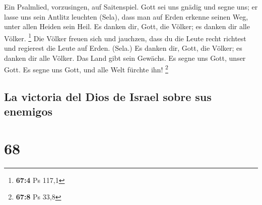  Ein Psalmlied, vorzusingen, auf Saitenspiel.
 Gott sei uns gnädig und segne uns; er lasse uns sein
Antlitz leuchten (Sela),  dass man auf Erden erkenne
seinen Weg, unter allen Heiden sein Heil.  Es danken dir,
Gott, die Völker; es danken dir alle Völker. \footnote{\textbf{67:4} Ps
  117,1}  Die Völker freuen sich und jauchzen, dass du die
Leute recht richtest und regierest die Leute auf Erden. (Sela.)
 Es danken dir, Gott, die Völker; es danken dir alle
Völker.  Das Land gibt sein Gewächs. Es segne uns Gott,
unser Gott.  Es segne uns Gott, und alle Welt fürchte ihn!
\footnote{\textbf{67:8} Ps 33,8}

\hypertarget{la-victoria-del-dios-de-israel-sobre-sus-enemigos}{%
\subsection{La victoria del Dios de Israel sobre sus
enemigos}\label{la-victoria-del-dios-de-israel-sobre-sus-enemigos}}

\hypertarget{section-67}{%
\section{68}\label{section-67}}

